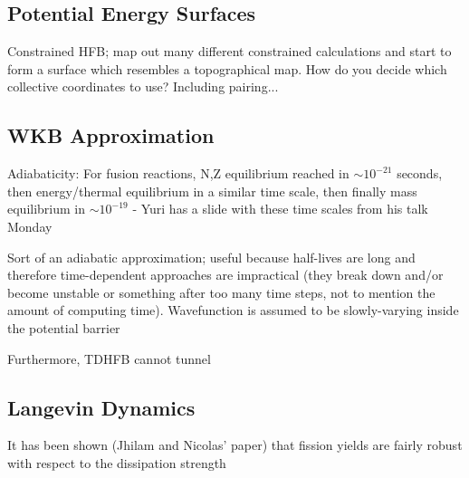 \subsection{Potential Energy Surfaces}
Constrained HFB; map out many different constrained calculations and start to form a surface which resembles a topographical map. How do you decide which collective coordinates to use? Including pairing...

\subsection{WKB Approximation}

Adiabaticity: For fusion reactions, N,Z equilibrium reached in $\sim10^{-21}$ seconds, then energy/thermal equilibrium in a similar time scale, then finally mass equilibrium in $\sim10^{-19}$ - Yuri has a slide with these time scales from his talk Monday

Sort of an adiabatic approximation; useful because half-lives are long and therefore time-dependent approaches are impractical (they break down and/or become unstable or something after too many time steps, not to mention the amount of computing time). Wavefunction is assumed to be slowly-varying inside the potential barrier

Furthermore, TDHFB cannot tunnel

\subsection{Langevin Dynamics}

It has been shown (Jhilam and Nicolas' paper) that fission yields are fairly robust with respect to the dissipation strength
